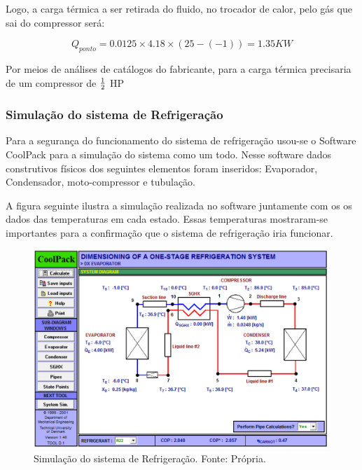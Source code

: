             Logo, a carga térmica a ser retirada do fluido, no trocador de calor, pelo gás
            que sai do compressor será:

            \begin{equation}
                Q_{ponto} = 0.0125 \times 4.18 \times (25-(-1)) = 1.35 KW
            \end{equation}

            Por meios de análises de catálogos do fabricante, para a carga térmica
            precisaria de um compressor de $1 \over 2$ HP

            \subsubsection[Simulação do sistema de Refrigeração]{Simulação do sistema de Refrigeração}
                Para a segurança do funcionamento do sistema de refrigeração usou-se o
                Software CoolPack para a simulação do sistema como um todo. Nesse software dados
                construtivos físicos dos seguintes elementos foram inseridos: Evaporador,
                Condensador, moto-compressor e tubulação.
                
                A figura seguinte ilustra a simulação realizada no software juntamente com os os
                dados das temperaturas em cada estado. Essas temperaturas mostraram-se
                importantes para a confirmação que o sistema de refrigeração iria funcionar.

                \begin{figure}[!htb]
            		\centering
            		\includegraphics[scale= 0.3]{figuras/simulacao-refrigeracao.png}
            		\caption{Simulação do sistema de Refrigeração. Fonte: Própria.}
            		\label{simulacao-refrigeracao}
                \end{figure}
                
